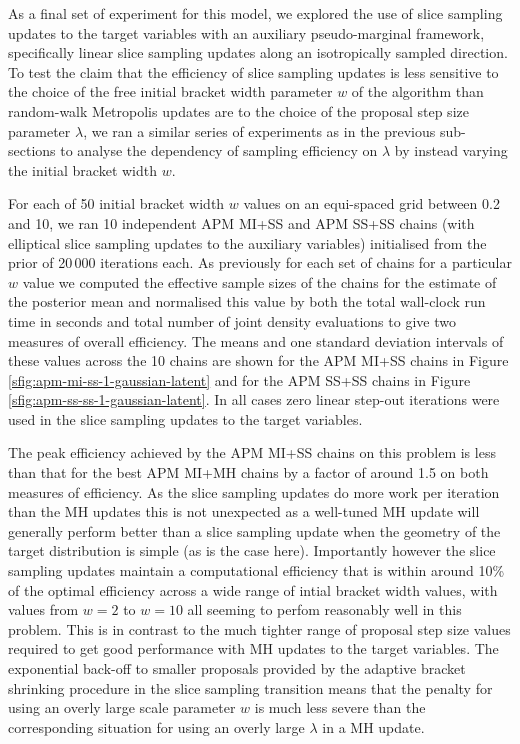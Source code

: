 As a final set of experiment for this model, we explored the use of slice sampling updates to the target variables with an auxiliary pseudo-marginal framework, specifically linear slice sampling updates along an isotropically sampled direction. To test the claim that the efficiency of slice sampling updates is less sensitive to the choice of the free initial bracket width parameter $w$ of the algorithm than random-walk Metropolis updates are to the choice of the proposal step size parameter $\lambda$, we ran a similar series of experiments as in the previous sub-sections to analyse the dependency of sampling efficiency on $\lambda$ by instead varying the initial bracket width $w$. 

For each of 50 initial bracket width $w$ values on an equi-spaced grid between 0.2 and 10, we ran 10 independent \ac{APM} \ac{MI}+\ac{SS} and \ac{APM} \ac{SS}+\ac{SS} chains (with elliptical slice sampling updates to the auxiliary variables) initialised from the prior of 20\,000 iterations each. As previously for each set of chains for a particular $w$ value we computed the effective sample sizes of the chains for the estimate of the posterior mean and normalised this value by both the total wall-clock run time in seconds and total number of joint density evaluations to give two measures of overall efficiency. The means and one standard deviation intervals of these values across the 10 chains are shown for the \ac{APM} \ac{MI}+\ac{SS} chains in Figure \ref{sfig:apm-mi-ss-1-gaussian-latent} and for the \ac{APM} \ac{SS}+\ac{SS} chains in Figure \ref{sfig:apm-ss-ss-1-gaussian-latent}. In all cases zero linear step-out iterations were used in the slice sampling updates to the target variables.

The peak efficiency achieved by the \ac{APM} \ac{MI}+\ac{SS} chains on this problem is less than that for the best \ac{APM} \ac{MI}+\ac{MH} chains by a factor of around 1.5 on both measures of efficiency. As the slice sampling updates do more work per iteration than the \ac{MH} updates this is not unexpected as a well-tuned \ac{MH} update will generally perform better than a slice sampling update when the geometry of the target distribution is simple (as is the case here). Importantly however the slice sampling updates maintain a computational efficiency that is within around 10\% of the optimal efficiency across a wide range of intial bracket width values, with values from $w=2$ to $w=10$ all seeming to perfom reasonably well in this problem. This is in contrast to the much tighter range of proposal step size values required to get good performance with \ac{MH} updates to the target variables. The exponential back-off to smaller proposals provided by the adaptive bracket shrinking procedure in the slice sampling transition means that the penalty for using an overly large scale parameter $w$ is much less severe than the corresponding situation for using an overly large $\lambda$ in a \ac{MH} update.

